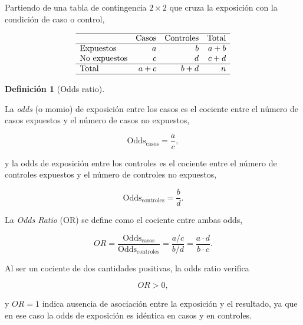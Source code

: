 \documentclass[
  spanish,
  a4paper,
]{scrreport}
\theoremstyle{definition}
\theoremstyle{definition}
\newtheorem{definition}{Definición}[chapter]
\theoremstyle{remark}
\begin{document}
Partiendo de una tabla de contingencia \(2\times 2\) que cruza la
exposición con la condición de caso o control,

\[
\begin{array}{lrrr}
\hline
 & \mbox{Casos} & \mbox{Controles} & \mbox{Total}\\
\hline
\mbox{Expuestos} & a & b & a+b\\
\mbox{No expuestos} & c & d & c+d\\
\hline
\mbox{Total} & a+c & b+d & n\\
\hline
\end{array}
\]

\begin{definition}[Odds
ratio]\protect\hypertarget{def-casoscontroles-odds-ratio}{}\label{def-casoscontroles-odds-ratio}

La \emph{odds} (o momio) de exposición entre los casos es el cociente
entre el número de casos expuestos y el número de casos no expuestos,

\[\mbox{Odds}_{\mbox{casos}} = \frac{a}{c},\]

y la odds de exposición entre los controles es el cociente entre el
número de controles expuestos y el número de controles no expuestos,

\[\mbox{Odds}_{\mbox{controles}} = \frac{b}{d}.\]

La \emph{Odds Ratio} (OR) se define como el cociente entre ambas odds,

\[OR = \frac{\mbox{Odds}_{\mbox{casos}}}{\mbox{Odds}_{\mbox{controles}}} = \frac{a/c}{b/d} = \frac{a\cdot d}{b\cdot c}.\]

\end{definition}

\begin{tcolorbox}[enhanced jigsaw, arc=.35mm, bottomrule=.15mm, bottomtitle=1mm, breakable, colback=white, colbacktitle=quarto-callout-important-color!10!white, colframe=quarto-callout-important-color-frame, coltitle=black, left=2mm, leftrule=.75mm, opacityback=0, opacitybacktitle=0.6, rightrule=.15mm, title=\textcolor{quarto-callout-important-color}{\faExclamation}\hspace{0.5em}{Importante}, titlerule=0mm, toprule=.15mm, toptitle=1mm]

Al ser un cociente de dos cantidades positivas, la odds ratio verifica

\[OR > 0,\]

y \(OR=1\) indica ausencia de asociación entre la exposición y el
resultado, ya que en ese caso la odds de exposición es idéntica en casos
y en controles.

\end{tcolorbox}
\end{document}
